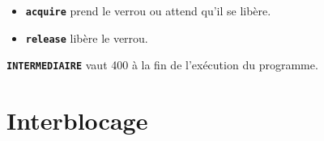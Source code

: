 \documentclass[svgnames,11pt]{beamer}
\begin{document}
\begin{frame}
    \frametitle{}

    \begin{itemize}
        \item \textbf{\texttt{acquire}} prend le verrou ou attend qu'il se libère.
        \item \textbf{\texttt{release}} libère le verrou.
    \end{itemize}
    \begin{center}
        \textbf{\texttt{INTERMEDIAIRE}} vaut 400 à la fin de l'exécution du programme.
    \end{center}
\end{frame}
\section{Interblocage}
\end{document}
